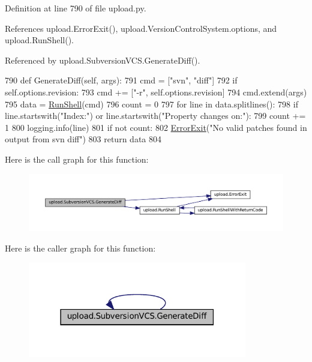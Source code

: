 Definition at line 790 of file upload.\+py.



References upload.\+Error\+Exit(), upload.\+Version\+Control\+System.\+options, and upload.\+Run\+Shell().



Referenced by upload.\+Subversion\+V\+C\+S.\+Generate\+Diff().


\begin{DoxyCode}
790   \textcolor{keyword}{def }GenerateDiff(self, args):
791     cmd = [\textcolor{stringliteral}{"svn"}, \textcolor{stringliteral}{"diff"}]
792     \textcolor{keywordflow}{if} self.options.revision:
793       cmd += [\textcolor{stringliteral}{"-r"}, self.options.revision]
794     cmd.extend(args)
795     data = \hyperlink{namespaceupload_adddc423c49132e8879cbb25d6be2cf11}{RunShell}(cmd)
796     count = 0
797     \textcolor{keywordflow}{for} line \textcolor{keywordflow}{in} data.splitlines():
798       \textcolor{keywordflow}{if} line.startswith(\textcolor{stringliteral}{"Index:"}) \textcolor{keywordflow}{or} line.startswith(\textcolor{stringliteral}{"Property changes on:"}):
799         count += 1
800         logging.info(line)
801     \textcolor{keywordflow}{if} \textcolor{keywordflow}{not} count:
802       \hyperlink{namespaceupload_adea53186a1d73e92cc839b7c35c2c044}{ErrorExit}(\textcolor{stringliteral}{"No valid patches found in output from svn diff"})
803     \textcolor{keywordflow}{return} data
804 
\end{DoxyCode}
Here is the call graph for this function\+:
\nopagebreak
\begin{figure}[H]
\begin{center}
\leavevmode
\includegraphics[width=350pt]{classupload_1_1SubversionVCS_a07c2d341f2c7df2772dd7f85e89b0212_cgraph}
\end{center}
\end{figure}
Here is the caller graph for this function\+:
\nopagebreak
\begin{figure}[H]
\begin{center}
\leavevmode
\includegraphics[width=271pt]{classupload_1_1SubversionVCS_a07c2d341f2c7df2772dd7f85e89b0212_icgraph}
\end{center}
\end{figure}
